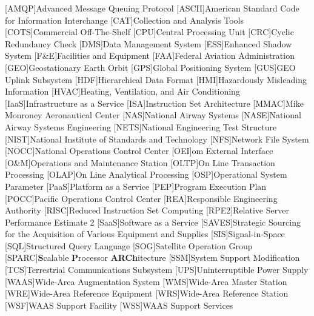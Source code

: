 \begin{acronym}[WAAS]
[AMQP]{Advanced Message Queuing Protocol}
[ASCII]{American Standard Code for Information Interchange}
[CAT]{Collection and Analysis Tools}
[COTS]{Commercial Off-The-Shelf}
[CPU]{Central Processing Unit}
[CRC]{Cyclic Redundancy Check}
[DMS]{Data Management System}
[ESS]{Enhanced Shadow System}
[F\&E]{Facilities and Equipment}
[FAA]{Federal Aviation Administration}
[GEO]{Geostationary Earth Orbit}
[GPS]{Global Positioning System}
[GUS]{GEO Uplink Subsystem}
[HDF]{Hierarchical Data Format}
[HMI]{Hazardously Misleading Information}
[HVAC]{Heating, Ventilation, and Air Conditioning}
[IaaS]{Infrastructure as a Service}
[ISA]{Instruction Set Architecture}
[MMAC]{Mike Monroney Aeronautical Center}
[NAS]{National Airway Systems}
[NASE]{National Airway Systems Engineering}
[NETS]{National Engineering Test Structure}
[NIST]{National Institute of Standards and Technology}
[NFS]{Network File System}
[NOCC]{National Operations Control Center}
[OEI]{\ac{om} External Interface}
[O\&M]{Operations and Maintenance Station}
[OLTP]{On Line Transaction Processing}
[OLAP]{On Line Analytical Processing}
[OSP]{Operational System Parameter}
[PaaS]{Platform as a Service}
[PEP]{Program Execution Plan}
[POCC]{Pacific Operations Control Center}
[REA]{Responsible Engineering Authority}
[RISC]{Reduced Instruction Set Computing}
[RPE2]{Relative Server Performance Estimate 2}
[SaaS]{Software as a Service}
[SAVES]{Strategic Sourcing for the Acquisition of Various Equipment and Supplies}
[SIS]{Signal-in-Space}
[SQL]{Structured Query Language}
[SOG]{Satellite Operation Group}
[SPARC]{\textbf{S}calable \textbf{P}rocessor \textbf{ARCh}itecture}
[SSM]{System Support Modification}
[TCS]{Terrestrial Communications Subsystem}
[UPS]{Uninterruptible Power Supply}
[WAAS]{Wide-Area Augmentation System}
[WMS]{Wide-Area Master Station}
[WRE]{Wide-Area Reference Equipment}
[WRS]{Wide-Area Reference Station}
[WSF]{WAAS Support Facility}
[WSS]{WAAS Support Services}
\end{acronym}
